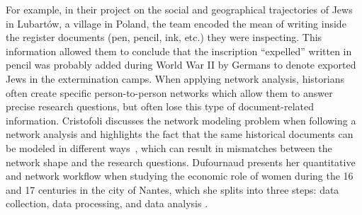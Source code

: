 For example, in their project on the social and geographical trajectories of Jews in Lubartów\cite{zakrzewski1932PopulationRegister2020}, a village in Poland, the team encoded the mean of writing inside the register documents (pen, pencil, ink, etc.) they were inspecting.
This information  allowed them to conclude that the inscription ``expelled'' written in pencil was probably added during World War II by Germans to denote exported Jews in the extermination camps.
When applying network analysis, historians often create specific person-to-person networks which allow them to answer precise research questions, but often lose this type of document-related information.
Cristofoli discusses the network modeling problem when following a network analysis and highlights the fact that the same historical documents can be modeled in different ways~\cite{cristofoliAuxSourcesGrands2008}, which can result in mismatches between the network shape and the research questions.
Dufournaud presents her quantitative and network workflow when studying the economic role of women during the 16 and 17 centuries in the city of Nantes, which she splits into three steps: data collection, data processing, and data analysis \cite{dufournaudCommentRendreVisible2018}.







